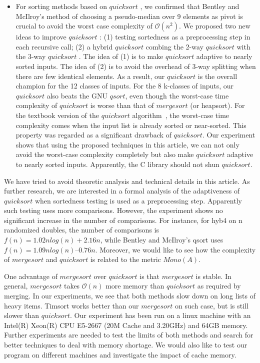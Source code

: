 \documentclass[AMA,STIX1COL]{WileyNJD-v2}
\newcommand{\qusort}{$quicksort$ }
\newcommand{\qusortn}{$quicksort$}
\newcommand{\qsortn}{$qsort$}
\newcommand{\msort}{$mergesort$ }
\begin{document}
\begin{itemize}
\item For sorting methods based on \qusort, we confirmed that Bentley and McIlroy’s method of choosing a pseudo-median over 9 elements as pivot is crucial to avoid the worst case complexity of $\mathcal{O}(n^2)$. 
We proposed two new ideas to improve \qusort: (1) testing sortedness as a preprocessing step in each recursive call; (2) a hybrid \qusort combing the 2-way \qusort with the 3-way \qusort. The idea of (1) is to make \qusort adaptive to nearly sorted inputs. The idea of (2) is to avoid the overhead of 3-way splitting when there are few identical elements. As a result, our \qusort is the overall champion for the 12 classes of inputs. For the 8 k-classes of inputs, our \qusort also beats the GNU \qsortn, even though the worst-case time complexity of \qusort is worse than that of \msort (or heapsort). For the textbook version of the \qusort algorithm~\cite{10.5555/1614191}, the worst-case time complexity comes when the input list is already sorted or near-sorted. This property was regarded as a significant drawback of \qusortn. Our experiment shows that using the proposed techniques in this article, we can not only avoid the worst-case complexity completely but also make \qusort adaptive to nearly sorted inputs. Apparently, the C library should not shun \qusortn.
\end{itemize}

We have tried to avoid theoretic analysis and technical details in this article. 
As further research, we are interested in a formal analysis of the adaptiveness of \qusort when sortedness testing is used as a preprocessing step. 
Apparently such testing uses more comparisons. 
However, the experiment shows no significant increase in the number of comparisons. 
For instance, for hyb4 on n randomized doubles, the number of comparisons is $f(n) = 1.02nlog(n) + 2.16n$, while Bentley and McIlroy’s qsort uses $f(n) = 1.09nlog(n) – 0.76n$.  
Moreover, we would like to see how the complexity of \msort and \qusort is related to the metric $Mono(A)$.

One advantage of \msort over \qusort is that \msort is stable. In general, \msort takes $\mathcal{O}(n)$ more memory than \qusort as required by merging. 
In our experiments, we see that both methods slow down on long lists of heavy items. Timsort works better than our \msort on such case, but is still slower than \qusortn. 
Our experiment has been run on a linux machine with an Intel(R) Xeon(R) CPU E5-2667 (20M Cache and 3.20GHz) and 64GB memory. 
Further experiments are needed to test the limits of both methods and search for better techniques to deal with memory shortage. 
We would also like to test our program on different machines and investigate the impact of cache memory. 
\end{document}

